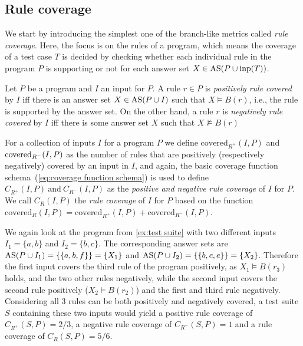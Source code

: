 \subsection{Rule coverage}
\label{subsec:Coverage metrics/Branch-like coverage/Rule coverage}
We start by introducing the simplest one of the branch-like metrics called \emph{rule coverage}. Here, the focus is on the rules of a program, which means the coverage of a test case $T$ is decided by checking whether each individual rule in the program $P$ is supporting or not for each answer set \(X \in \operatorname{AS}(P \cup \operatorname{inp}(T))\).

\begin{definition}
\label{def:rule coverage}
    Let $P$ be a program and $I$ an input for $P$. A rule \(r \in P\) is \emph{positively rule covered} by $I$ iff there is an answer set \(X \in \operatorname{AS}(P \cup I)\) such that \(X \models B(r)\), i.e., the rule is supported by the answer set.
    On the other hand, a rule $r$ is \emph{negatively rule covered} by $I$ iff there is some answer set $X$ such that \(X \not\models B(r)\)
\end{definition}

For a collection of inputs $I$ for a program $P$ we define \(\text{covered}_{R^+}(I, P)\) and \(\text{covered}_{R^-}\\(I, P)\) as the number of rules that are positively (respectively negatively) covered by an input in $I$, and again, the basic coverage function schema~(\ref{eq:coverage function schema}) is used to define \(C_{R^+}(I, P)\ \text{and}\ C_{R^-}(I, P)\) as the \emph{positive and negative rule coverage} of $I$ for $P$. We call \(C_R(I, P)\) the \emph{rule coverage} of $I$ for $P$ based on the function \(\text{covered}_{R}(I, P) = \text{covered}_{R^+}(I, P) + \text{covered}_{R^-}(I, P)\).

\begin{example}
\label{ex:rule coverage}
    We again look at the program from \cref{ex:test suite} with two different inputs \(I_1 = \{a, b\}\) and \(I_2 = \{b, c\}\). The corresponding answer sets are \(\operatorname{AS}(P \cup I_1) = \{\{a, b, f\}\} = \{X_1\}\) and \(\operatorname{AS}(P \cup I_2) = \{\{b, c, e\}\} = \{X_2\}\). Therefore the first input covers the third rule of the program positively, as \(X_1 \models B(r_3)\) holds, and the two other rules negatively, while the second input covers the second rule positively (\(X_2 \models B(r_2)\)) and the first and third rule negatively. Considering all 3 rules can be both positively and negatively covered, a test suite $S$ containing these two inputs would yield a positive rule coverage of \(C_{R^+}(S, P) = 2/3\), a negative rule coverage of \(C_{R^-}(S, P) = 1\) and a rule coverage of \(C_R(S, P) = 5/6\).
\end{example}

